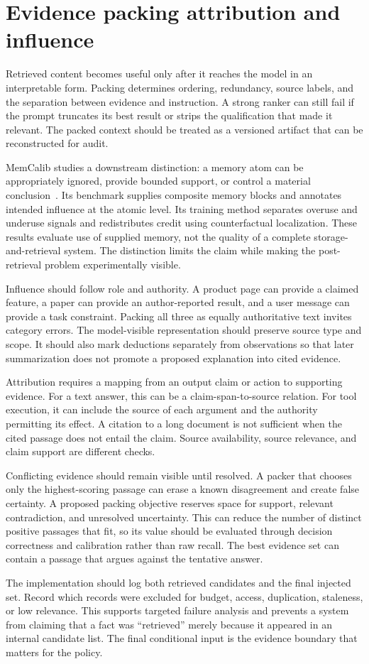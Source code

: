 \section{Evidence packing attribution and influence}\label{sec:C16:packing}
Retrieved content becomes useful only after it reaches the model in an interpretable form. Packing determines ordering, redundancy, source labels, and the separation between evidence and instruction. A strong ranker can still fail if the prompt truncates its best result or strips the qualification that made it relevant. The packed context should be treated as a versioned artifact that can be reconstructed for audit.

MemCalib studies a downstream distinction: a memory atom can be appropriately ignored, provide bounded support, or control a material conclusion~\cite{memcalib2026}. Its benchmark supplies composite memory blocks and annotates intended influence at the atomic level. Its training method separates overuse and underuse signals and redistributes credit using counterfactual localization. These results evaluate use of supplied memory, not the quality of a complete storage-and-retrieval system. The distinction limits the claim while making the post-retrieval problem experimentally visible.

Influence should follow role and authority. A product page can provide a claimed feature, a paper can provide an author-reported result, and a user message can provide a task constraint. Packing all three as equally authoritative text invites category errors. The model-visible representation should preserve source type and scope. It should also mark deductions separately from observations so that later summarization does not promote a proposed explanation into cited evidence.

Attribution requires a mapping from an output claim or action to supporting evidence. For a text answer, this can be a claim-span-to-source relation. For tool execution, it can include the source of each argument and the authority permitting its effect. A citation to a long document is not sufficient when the cited passage does not entail the claim. Source availability, source relevance, and claim support are different checks.

Conflicting evidence should remain visible until resolved. A packer that chooses only the highest-scoring passage can erase a known disagreement and create false certainty. A proposed packing objective reserves space for support, relevant contradiction, and unresolved uncertainty. This can reduce the number of distinct positive passages that fit, so its value should be evaluated through decision correctness and calibration rather than raw recall. The best evidence set can contain a passage that argues against the tentative answer.

The implementation should log both retrieved candidates and the final injected set. Record which records were excluded for budget, access, duplication, staleness, or low relevance. This supports targeted failure analysis and prevents a system from claiming that a fact was ``retrieved'' merely because it appeared in an internal candidate list. The final conditional input is the evidence boundary that matters for the policy.

